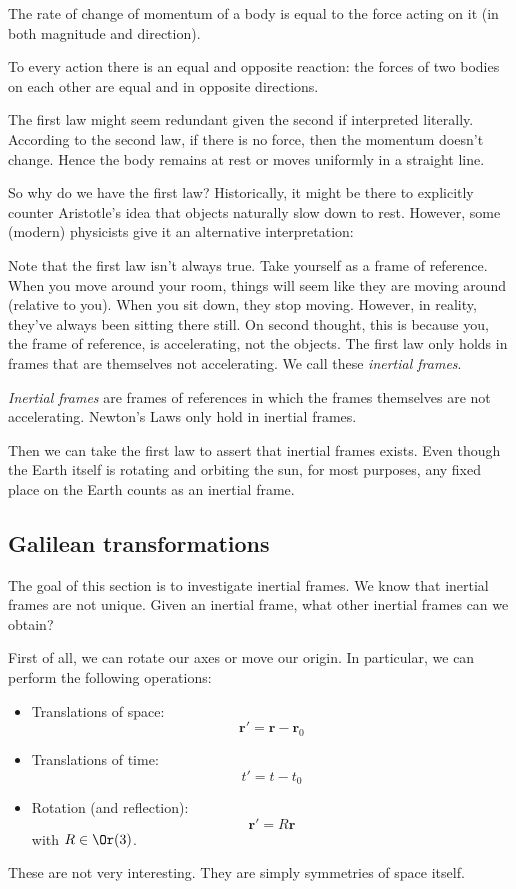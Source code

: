 \documentclass[a4paper]{article}
\begin{document}
\begin{law}
   The rate of change of momentum of a body is equal to the force acting on it (in both magnitude and direction).
\end{law}

\begin{law}
  To every action there is an equal and opposite reaction: the forces of two bodies on each other are equal and in opposite directions.
\end{law}
The first law might seem redundant given the second if interpreted literally. According to the second law, if there is no force, then the momentum doesn't change. Hence the body remains at rest or moves uniformly in a straight line.

So why do we have the first law? Historically, it might be there to explicitly counter Aristotle's idea that objects naturally slow down to rest. However, some (modern) physicists give it an alternative interpretation:

Note that the first law isn't always true. Take yourself as a frame of reference. When you move around your room, things will seem like they are moving around (relative to you). When you sit down, they stop moving. However, in reality, they've always been sitting there still. On second thought, this is because you, the frame of reference, is accelerating, not the objects. The first law only holds in frames that are themselves not accelerating. We call these \emph{inertial frames}.
\begin{defi}
  \emph{Inertial frames} are frames of references in which the frames themselves are not accelerating. Newton's Laws only hold in inertial frames.
\end{defi}
Then we can take the first law to assert that inertial frames exists. Even though the Earth itself is rotating and orbiting the sun, for most purposes, any fixed place on the Earth counts as an inertial frame.

\subsection{Galilean transformations}
The goal of this section is to investigate inertial frames. We know that inertial frames are not unique. Given an inertial frame, what other inertial frames can we obtain?

First of all, we can rotate our axes or move our origin. In particular, we can perform the following operations:
\begin{itemize}
  \item Translations of space:
    \[
      \mathbf{r}' = \mathbf{r} - \mathbf{r}_0
    \]
  \item Translations of time:
    \[
      t' = t - t_0
    \]
  \item Rotation (and reflection):
    \[
      \mathbf{r}' = R\mathbf{r}
    \]
    with $R\in \Or(3)$.
\end{itemize}
These are not very interesting. They are simply symmetries of space itself.
\end{document}
